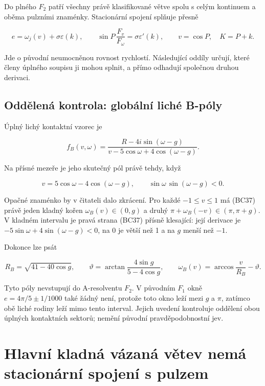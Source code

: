 \documentclass[11pt,a4paper]{article}
\theoremstyle{remark}\newtheorem{remark}[theorem]{Poznámka}
\numberwithin{equation}{section}
\begin{document}
Do plného \(F_2\) patří všechny právě klasifikované větve spolu s celým
kontinuem a oběma pulzními znaménky. Stacionární spojení splňuje přesně

\[
e=\omega_j(v)+\sigma\varepsilon(k),\qquad
\sin P\,\frac{F_v}{F_\omega}
=\sigma\varepsilon'(k),\qquad v=\cos P,\quad K=P+k.
\tag{BC35}
\]

Jde o původní neumocněnou rovnost rychlostí. Následující oddíly určují,
které členy úplného soupisu ji mohou splnit, a přímo odhadují společnou
druhou derivaci.

\hypertarget{oddux11blenuxe1-kontrola-globuxe1lnuxed-lichuxe9-b-puxf3ly}{%
\subsection{Oddělená kontrola: globální liché
B-póly}\label{oddux11blenuxe1-kontrola-globuxe1lnuxed-lichuxe9-b-puxf3ly}}

Úplný lichý kontaktní vzorec je

\[
f_B(v,\omega)=
\frac{R-4i\sin(\omega-g)}{v-5\cos\omega+4\cos(\omega-g)}.
\tag{BC36}
\]

Na přísné mezeře je jeho skutečný pól právě tehdy, když

\[
v=5\cos\omega-4\cos(\omega-g),
\qquad \sin\omega\,\sin(\omega-g)<0.
\tag{BC37}
\]

Opačné znaménko by v čitateli dalo zkrácení. Pro každé \(-1\le v\le1\)
má (BC37) právě jeden kladný kořen \(\omega_B(v)\in(0,g)\) a druhý
\(\pi+\omega_B(-v)\in(\pi,\pi+g)\). V kladném intervalu je pravá strana
(BC37) přísně klesající: její derivace je
\(-5\sin\omega+4\sin(\omega-g)<0\), na \(0\) je větší než 1 a na \(g\)
menší než \(-1\).

Dokonce lze psát

\[
R_B=\sqrt{41-40\cos g},\qquad
\vartheta=\arctan\frac{4\sin g}{5-4\cos g},
\qquad
\boxed{\omega_B(v)=\arccos\frac v{R_B}-\vartheta.}
\tag{BC38}
\]

Tyto póly nevstupují do A-resolventu \(F_2\). V původním \(F_1\) okně
\(e=4\pi/5\pm1/1000\) také žádný není, protože toto okno leží mezi \(g\)
a \(\pi\), zatímco obě liché rodiny leží mimo tento interval. Jejich
uvedení kontroluje oddělení obou úplných kontaktních sektorů; nemění
původní pravděpodobnostní jev.

\section{Hlavní kladná vázaná větev nemá stacionární spojení s pulzem}
\end{document}
